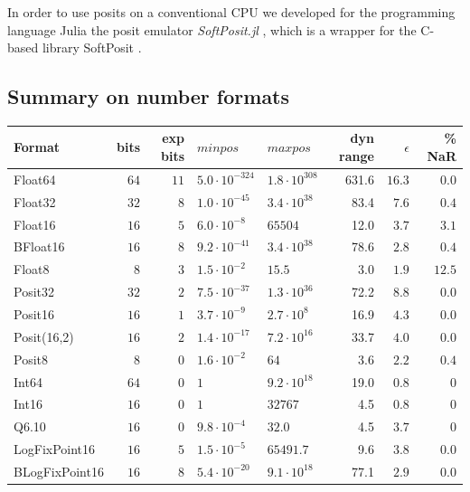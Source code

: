 In order to use posits on a conventional CPU we developed for the programming language Julia \citep{Bezanson2017} the posit
emulator \emph{SoftPosit.jl} \citep{Klower2019}, which is a wrapper for the C-based library SoftPosit \citep{Leong2020}.

\subsection{Summary on number formats}
\label{sec:summary_formats}

\begin{table}[htbp]
	\center
	\begin{tabular}{l | r | r | l | l | r | r | r}
	\textbf{Format} & bits & exp bits & $minpos$ & $maxpos$ & dyn range & $\epsilon$ &  \% NaR \\
	\hline
	Float64    & $64$ & $11$ & $5.0 \cdot 10^{-324}$ & $1.8 \cdot 10^{308}$ & 631.6 & $16.3$ & $0.0$ \\
	Float32    & $32$ & $8$ & $1.0 \cdot 10^{-45}$ & $3.4 \cdot 10^{38}$ & 83.4 & $7.6$ & $0.4$ \\
	Float16    & $16$ & $5$ & $6.0 \cdot 10^{-8}$ & $65504$ & 12.0 & $3.7$ & $3.1$ \\
	BFloat16    & $16$ & $8$ & $ 9.2 \cdot 10^{-41}$ & $3.4 \cdot 10^{38}$ & 78.6 & $2.8$ & $0.4$  \\
        Float8 & $8$ & $3$ & $1.5 \cdot 10^{-2}$ & $15.5$ & 3.0 & $1.9$ & $12.5$\\
        \hline
        Posit32 & $32$ & $2$ &  $7.5 \cdot 10^{-37}$ & $1.3 \cdot 10^{36}$ & 72.2 & $8.8$ & $0.0$ \\
        Posit16 & $16$ & $1$ & $3.7 \cdot 10^{-9}$ & $2.7 \cdot 10^{8}$ & 16.9 & $4.3$ & $0.0$\\
        Posit(16,2) & $16$ & $2$ & $1.4 \cdot 10^{-17}$ & $7.2 \cdot 10^{16}$ & 33.7 & $4.0$ & $0.0$\\
        Posit8 & $8$ & $0$ & $1.6 \cdot 10^{-2}$ & $64$ & 3.6 & $2.2$ & $0.4$  \\
        \hline
        Int64 & $64$ & $0$ & $1$ & $9.2 \cdot 10^{18}$ & 19.0 & $0.8$ & $0$\\
        Int16 & $16$ & $0$ & $1$ & $32767$ & 4.5 & $0.8$ & $0$\\
        Q6.10 & $16$ & $0$ & $9.8 \cdot 10^{-4}$ & $32.0$ & 4.5 & $3.7$ & $0$\\
        \hline
        LogFixPoint16 & $16$ & $5$ & $1.5 \cdot 10^{-5}$ & $65491.7$ & 9.6 & $3.8$ & $0.0$\\
        BLogFixPoint16 & $16$ & $8$ & $5.4 \cdot 10^{-20}$ & $9.1 \cdot 10^{18}$ & 77.1 & $2.9$ & $0.0$

\end{tabular}
\end{table}
